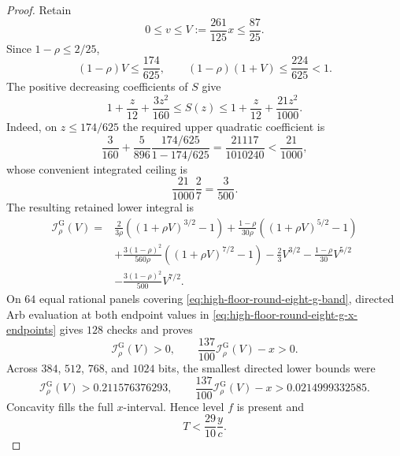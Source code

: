 \documentclass[11pt]{article}
\theoremstyle{remark}
\begin{document}
\begin{proof}
Retain
\[
 0\leq v\leq V:=\frac{261}{125}x\leq\frac{87}{25}.
\]
Since $1-\rho\leq2/25$,
\begin{equation}
 (1-\rho)V\leq\frac{174}{625},\qquad
 (1-\rho)(1+V)\leq\frac{224}{625}<1.
 \label{eq:high-floor-round-eight-g-series-domains}
\end{equation}
The positive decreasing coefficients of $S$ give
\begin{equation}
 1+\frac z{12}+\frac{3z^2}{160}
 \leq S(z)\leq
 1+\frac z{12}+\frac{21z^2}{1000}.
 \label{eq:high-floor-round-eight-g-series}
\end{equation}
Indeed, on $z\leq174/625$ the required upper quadratic coefficient is
\[
 \frac3{160}+\frac5{896}
 \frac{174/625}{1-174/625}
 =\frac{21117}{1010240}<\frac{21}{1000},
\]
whose convenient integrated ceiling is
\[
 \frac{21}{1000}\frac27=\frac3{500}.
\]
The resulting retained lower integral is
\begin{equation}
\begin{aligned}
 \mathcal I^{\mathrm G}_\rho(V)
={}&\frac{2}{3\rho}
 \left((1+\rho V)^{3/2}-1\right)
 +\frac{1-\rho}{30\rho}
 \left((1+\rho V)^{5/2}-1\right)\\
&+\frac{3(1-\rho)^2}{560\rho}
 \left((1+\rho V)^{7/2}-1\right)
 -\frac23V^{3/2}-\frac{1-\rho}{30}V^{5/2}\\
&-\frac{3(1-\rho)^2}{500}V^{7/2}.
\end{aligned}
 \label{eq:high-floor-round-eight-g-integral}
\end{equation}
On $64$ equal rational panels covering
\eqref{eq:high-floor-round-eight-g-band}, directed Arb evaluation at
both endpoint values in
\eqref{eq:high-floor-round-eight-g-x-endpoints} gives $128$ checks and
proves
\begin{equation}
 \mathcal I^{\mathrm G}_\rho(V)>0,\qquad
 \frac{137}{100}\mathcal I^{\mathrm G}_\rho(V)-x>0.
 \label{eq:high-floor-round-eight-g-integral-panels}
\end{equation}
Across $384$, $512$, $768$, and $1024$ bits, the smallest directed
lower bounds were
\[
 \mathcal I^{\mathrm G}_\rho(V)>0.211576376293,
\qquad
 \frac{137}{100}\mathcal I^{\mathrm G}_\rho(V)-x
 >0.0214999332585.
\]
Concavity fills the full $x$-interval.  Hence level $f$ is present and
\begin{equation}
 \boxed{T<\frac{29}{10}\frac yc.}
 \label{eq:high-floor-round-eight-g-level-distance}
\end{equation}


\end{proof}
\end{document}
